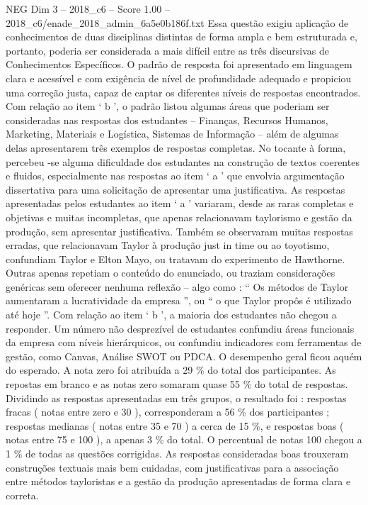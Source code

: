 \begin{textsample}{NEG Dim 3 – 2018\_c6 – Score 1.00 – 2018\_c6/enade\_2018\_admin\_6a5e0b186f.txt}
Essa questão exigiu aplicação de conhecimentos de duas disciplinas distintas de forma ampla e bem estruturada e, portanto, poderia ser considerada a mais difícil entre as três discursivas de Conhecimentos Específicos.
O padrão de resposta foi apresentado em linguagem clara e acessível e com exigência de nível de profundidade adequado e propiciou uma correção justa, capaz de captar os diferentes níveis de respostas encontrados.
Com relação ao item ‘ b ’, o padrão listou algumas áreas que poderiam ser consideradas nas respostas dos estudantes – Finanças, Recursos Humanos, Marketing, Materiais e Logística, Sistemas de Informação – além de algumas delas apresentarem três exemplos de respostas completas.
No tocante à forma, percebeu -se alguma dificuldade dos estudantes na construção de textos coerentes e fluidos, especialmente nas respostas ao item ‘ a ’ que envolvia argumentação dissertativa para uma solicitação de apresentar uma justificativa.
As respostas apresentadas pelos estudantes ao item ‘ a ’ variaram, desde as raras completas e objetivas e muitas incompletas, que apenas relacionavam taylorismo e gestão da produção, sem apresentar justificativa.
Também se observaram muitas respostas erradas, que relacionavam Taylor à produção just in time ou ao toyotismo, confundiam Taylor e Elton Mayo, ou tratavam do experimento de Hawthorne.
Outras apenas repetiam o conteúdo do enunciado, ou traziam considerações genéricas sem oferecer nenhuma reflexão – algo como : “ Os métodos de Taylor aumentaram a lucratividade da empresa ”, ou “ o que Taylor propôs é utilizado até hoje ”.
Com relação ao item ‘ b ’, a maioria dos estudantes não chegou a responder.
Um número não desprezível de estudantes confundiu áreas funcionais da empresa com níveis hierárquicos, ou confundiu indicadores com ferramentas de gestão, como Canvas, Análise SWOT ou PDCA.
O desempenho geral ficou aquém do esperado.
A nota zero foi atribuída a 29 \% do total dos participantes.
As repostas em branco e as notas zero somaram quase 55 \% do total de respostas.
Dividindo as respostas apresentadas em três grupos, o resultado foi : respostas fracas ( notas entre zero e 30 ), corresponderam a 56 \% dos participantes ; respostas medianas ( notas entre 35 e 70 ) a cerca de 15 \%, e respostas boas ( notas entre 75 e 100 ), a apenas 3 \% do total.
O percentual de notas 100 chegou a 1 \% de todas as questões corrigidas.
As respostas consideradas boas trouxeram construções textuais mais bem cuidadas, com justificativas para a associação entre métodos tayloristas e a gestão da produção apresentadas de forma clara e correta.

\end{textsample}
